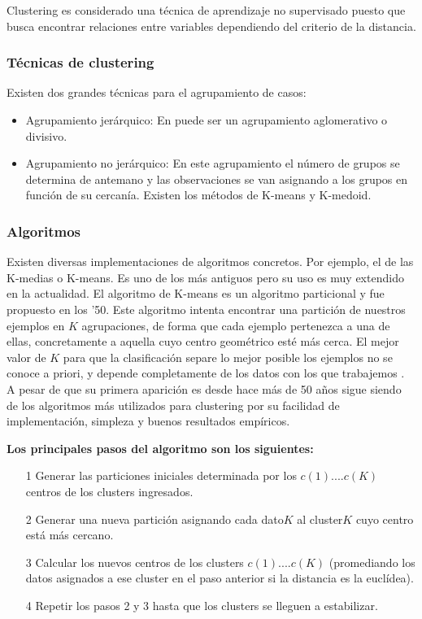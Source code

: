 Clustering es considerado una técnica de aprendizaje no supervisado puesto que busca encontrar relaciones entre variables dependiendo del criterio de la distancia.


\subsubsection{Técnicas de clustering}

Existen dos grandes técnicas para el agrupamiento de casos:

\begin{itemize}
	\item Agrupamiento jerárquico: En puede ser un agrupamiento aglomerativo o divisivo.
	\item Agrupamiento no jerárquico: En este agrupamiento el número de grupos se determina de antemano y las observaciones se van asignando a los grupos en función de su cercanía. Existen los métodos de K-means y K-medoid.

\end{itemize}

\subsubsection{Algoritmos}

Existen diversas implementaciones de algoritmos concretos. Por ejemplo, el de las K-medias o K-means. Es uno de los más antiguos pero su uso es muy extendido en la actualidad.
\vskip 1cm
El algoritmo de K-means es un algoritmo particional y fue propuesto en los ’50. Este algoritmo intenta encontrar una partición de nuestros ejemplos en \(K\) agrupaciones, de forma que cada ejemplo pertenezca a una de ellas, concretamente a aquella cuyo centro geométrico esté más cerca. El mejor valor de \(K\) para que la clasificación separe lo mejor posible los ejemplos no se conoce a priori, y depende completamente de los datos con los que trabajemos \citep{Jain}.
\vskip 1cm 
A pesar de que su primera aparición es desde hace más de 50 años sigue siendo de los algoritmos más utilizados para clustering por su facilidad de implementación, simpleza y buenos resultados empíricos.
\vskip 1cm 

\textbf{Los principales pasos del algoritmo son los siguientes:}

\begin{enumerate}
	\item[1] Generar las particiones iniciales determinada por los \(c(1)....c(K)\) centros de los clusters ingresados.
	\item[2] Generar una nueva partición asignando cada dato\(K\) al cluster\(K\) cuyo centro está más cercano.	
	\item[3] Calcular los nuevos centros de los clusters \(c(1)....c(K)\) (promediando los datos asignados a ese cluster en el paso anterior si la distancia es la euclídea).
	\item[4] Repetir los pasos 2 y 3 hasta que los clusters se lleguen a estabilizar.
\end{enumerate}

